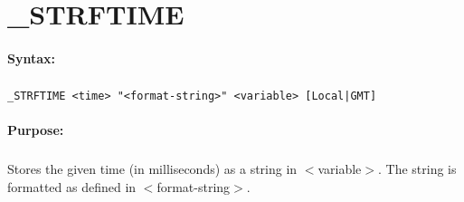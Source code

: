 
\newpage
\section{\_STRFTIME}
\label{cmd:_STRFTIME}

\paragraph{Syntax:}
\subparagraph{}
\texttt{\_STRFTIME <time> "<format-string>" <variable> [Local|GMT]}

\paragraph{Purpose:}
\subparagraph{}
Stores the given time (in milliseconds) as a string in $<$variable$>$. 
The string is formatted as defined in $<$format-string$>$.


